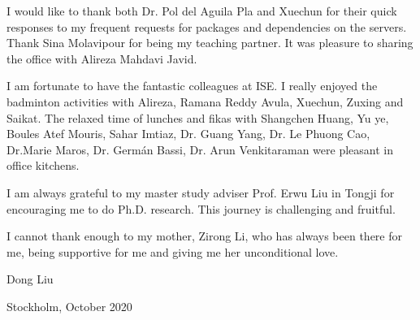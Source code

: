 I would like to thank both Dr. Pol del Aguila Pla and Xuechun for their quick responses to my frequent requests for packages and dependencies on the servers. Thank Sina Molavipour for being my teaching partner. It was pleasure to sharing the office with Alireza Mahdavi Javid.


I am fortunate to have the fantastic colleagues at ISE. I really enjoyed the badminton activities with Alireza, Ramana Reddy Avula, Xuechun, Zuxing and Saikat. The relaxed time of lunches and fikas with Shangchen Huang, Yu ye, Boules Atef Mouris, Sahar Imtiaz, Dr. Guang Yang, Dr. Le Phuong Cao, Dr.Marie Maros, Dr. Germ\'{a}n Bassi, Dr. Arun Venkitaraman were pleasant in office kitchens.

I am always grateful to my master study adviser Prof. Erwu Liu in Tongji for encouraging me to do Ph.D. research. This journey is challenging and fruitful.

I cannot thank enough to my mother, Zirong Li, who has always been there for me, being supportive for me and giving me her unconditional love. \newline

\hfill
Dong Liu

\hfill
Stockholm, October 2020









